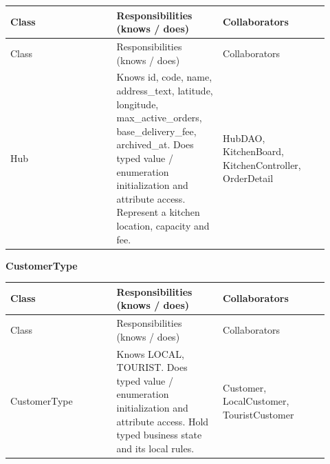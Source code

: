 \begin{longtable}{>{\raggedright\arraybackslash}p{0.3067\linewidth}>{\raggedright\arraybackslash}p{0.3067\linewidth}>{\raggedright\arraybackslash}p{0.3067\linewidth}}
Class & Responsibilities (knows / does) & Collaborators \\
\hline\endfirsthead
Class & Responsibilities (knows / does) & Collaborators \\
\hline\endhead
Hub & Knows id, code, name, address\_text, latitude, longitude, max\_active\_orders, base\_delivery\_fee, archived\_at. Does typed value / enumeration initialization and attribute access. Represent a kitchen location, capacity and fee. & HubDAO, KitchenBoard, KitchenController, OrderDetail \\
\end{longtable}
\textbf{CustomerType}

\begin{longtable}{>{\raggedright\arraybackslash}p{0.3067\linewidth}>{\raggedright\arraybackslash}p{0.3067\linewidth}>{\raggedright\arraybackslash}p{0.3067\linewidth}}
Class & Responsibilities (knows / does) & Collaborators \\
\hline\endfirsthead
Class & Responsibilities (knows / does) & Collaborators \\
\hline\endhead
CustomerType & Knows LOCAL, TOURIST. Does typed value / enumeration initialization and attribute access. Hold typed business state and its local rules. & Customer, LocalCustomer, TouristCustomer \\
\end{longtable}

